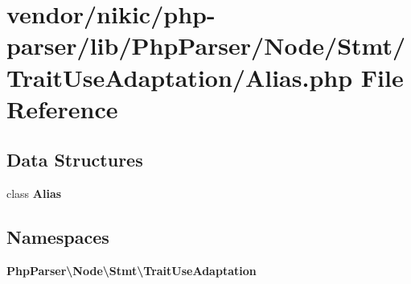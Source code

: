 \section{vendor/nikic/php-\/parser/lib/\+Php\+Parser/\+Node/\+Stmt/\+Trait\+Use\+Adaptation/\+Alias.php File Reference}
\label{_alias_8php}
\subsection*{Data Structures}
\begin{DoxyCompactItemize}
\item 
class {\bf Alias}
\end{DoxyCompactItemize}
\subsection*{Namespaces}
\begin{DoxyCompactItemize}
\item 
 {\bf Php\+Parser\textbackslash{}\+Node\textbackslash{}\+Stmt\textbackslash{}\+Trait\+Use\+Adaptation}
\end{DoxyCompactItemize}
